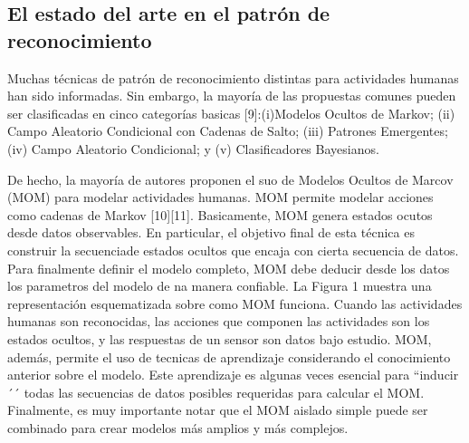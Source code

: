 \documentclass[a4paper]{article}
\begin{document}
\begin{}
\begin{}
\section{El estado del arte en el patrón de reconocimiento}
Muchas técnicas de patrón de reconocimiento distintas para actividades humanas han sido informadas. Sin embargo, la mayoría de las propuestas comunes pueden ser clasificadas en cinco categorías basicas [9]:(i)Modelos Ocultos de Markov; (ii) Campo Aleatorio Condicional con Cadenas de Salto; (iii) Patrones Emergentes; (iv) Campo Aleatorio Condicional; y (v) Clasificadores Bayesianos.
\setlegtth{\parindent}{<}\begin{}De hecho, la mayoría de autores proponen el suo de Modelos Ocultos de Marcov (MOM) para modelar actividades humanas. MOM permite modelar acciones como cadenas de Markov [10][11]. Basicamente, MOM genera estados ocutos desde datos observables. En particular, el objetivo final de esta técnica es construir la secuenciade estados ocultos que encaja con cierta secuencia de datos. Para finalmente definir el modelo completo, MOM debe deducir desde los datos los parametros del modelo de na manera confiable. La Figura 1 muestra una representación esquematizada
sobre como MOM funciona. Cuando las actividades humanas son reconocidas, las acciones que componen las actividades son los estados ocultos, y las respuestas de un sensor son datos bajo estudio. MOM, además, permite el uso de tecnicas de aprendizaje considerando el conocimiento anterior sobre el modelo. Este aprendizaje es algunas veces esencial para ``inducir´´ todas las secuencias de datos posibles requeridas para calcular el MOM. Finalmente, es muy importante notar que el MOM aislado simple puede ser combinado para crear modelos más amplios y más complejos. 


\end{}
\end{}
\end{}
\end{document}

